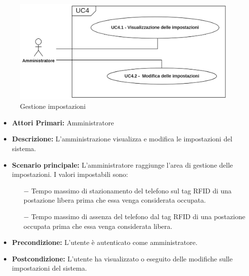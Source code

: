 \begin{figure}[H]
	\centering
	\includegraphics[width=15cm]{res/images/UC4.png}
	\caption{Gestione impostazioni}
	\label{fig:Gestione impostazioni}
\end{figure}
\begin{itemize}
           	\item\textbf{Attori Primari:} 
           	Amministratore
           	\item\textbf{Descrizione:} 
           	L'amministrazione visualizza e modifica le impostazioni del sistema.
           	\item\textbf{Scenario principale:}
           	L'amministratore raggiunge l'area di gestione delle impostazioni.
           	I valori impostabili sono:
           	\begin{itemize}
           		\item[$-$] Tempo massimo di stazionamento del telefono sul tag RFID di una postazione libera prima che essa venga considerata occupata.
           		\item[$-$] Tempo massimo di assenza del telefono dal tag RFID di una postazione occupata prima che essa venga considerata libera.
           	\end{itemize}
           	\item\textbf{Precondizione:} 
           	L'utente è autenticato come amministratore.
           	\item\textbf{Postcondizione:}
           	L'utente ha visualizzato o eseguito delle modifiche sulle impostazioni del sistema.
\end{itemize}

